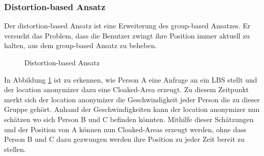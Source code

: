 \subsubsection{Distortion-based Ansatz} 
Der distortion-based Ansatz ist eine Erweiterung des group-based Ansatzes. Er versucht das Problem, dass die Benutzer zwingt ihre Position immer aktuell zu halten, aus dem group-based Ansatz zu beheben. 
\begin{figure}[!h]
		\centering
		\caption{Distortion-based Ansatz}
		\label{fig_chow2011_Distortion-Ansatz}
\end{figure}
In Abbildung \ref{fig_chow2011_Distortion-Ansatz} ist zu erkennen, wie Person A eine Anfrage an ein LBS stellt und der location anonymizer dazu eine Cloaked-Area erzeugt. Zu diesem Zeitpunkt merkt sich der location anonymizer die Geschwindigkeit jeder Person die zu dieser Gruppe gehört. Anhand der Geschwindigkeiten kann der location anonymizer nun schätzen wo sich Person B und C befinden könnten. Mithilfe dieser Schätzungen und der Position von A können nun Cloaked-Areas erzeugt werden, ohne dass Person B und C dazu gezwungen werden ihre Position zu jeder Zeit bereit zu stellen.
